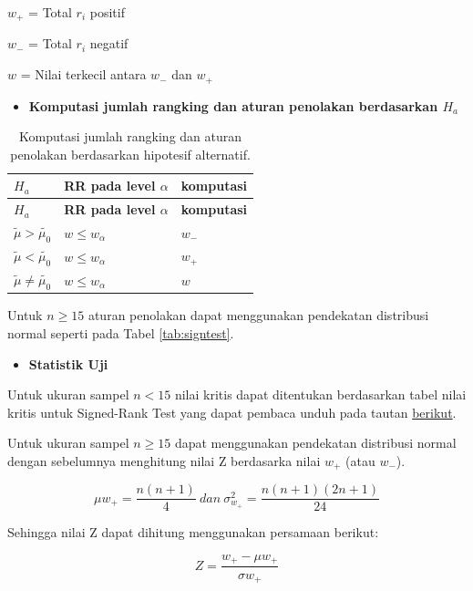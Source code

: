 \documentclass[]{book}
\providecommand{\tightlist}{%
  \setlength{\itemsep}{0pt}\setlength{\parskip}{0pt}}
\begin{document}
\(w_+\) = Total \(r_i\) positif

\(w_-\) = Total \(r_i\) negatif

\(w\) = Nilai terkecil antara \(w_-\) dan \(w_+\)

\begin{itemize}
\tightlist
\item
  \textbf{Komputasi jumlah rangking dan aturan penolakan berdasarkan
  \(H_a\)}
\end{itemize}

\begin{longtable}[]{@{}lll@{}}
\caption{\label{tab:signranktest} Komputasi jumlah rangking dan aturan
penolakan berdasarkan hipotesif alternatif.}\tabularnewline
\toprule
\textbf{\(H_a\)} & \textbf{RR pada level \(\alpha\)} &
\textbf{komputasi}\tabularnewline
\midrule
\endfirsthead
\toprule
\textbf{\(H_a\)} & \textbf{RR pada level \(\alpha\)} &
\textbf{komputasi}\tabularnewline
\midrule
\endhead
\(\tilde{\mu}> \tilde{\mu_0}\) & \(w \le w_\alpha\) &
\(w_-\)\tabularnewline
\(\tilde{\mu}< \tilde{\mu_0}\) & \(w \le w_\alpha\) &
\(w_+\)\tabularnewline
\(\tilde{\mu}\ne\tilde{\mu_0}\) & \(w \le w_\alpha\) &
\(w\)\tabularnewline
\bottomrule
\end{longtable}

Untuk \(n\ge15\) aturan penolakan dapat menggunakan pendekatan
distribusi normal seperti pada Tabel \ref{tab:signtest}.

\begin{itemize}
\tightlist
\item
  \textbf{Statistik Uji}
\end{itemize}

Untuk ukuran sampel \(n<15\) nilai kritis dapat ditentukan berdasarkan
tabel nilai kritis untuk Signed-Rank Test yang dapat pembaca unduh pada
tautan
\href{https://math.ucalgary.ca/files/math/wilcoxon_signed_rank_table.pdf}{berikut}.

Untuk ukuran sampel \(n\ge15\) dapat menggunakan pendekatan distribusi
normal dengan sebelumnya menghitung nilai Z berdasarka nilai \(w_+\)
(atau \(w_-\)).

\begin{equation}
\mu w_+=\frac{n\left(n+1\right)}{4}\ dan\ \sigma_{w_+}^2=\frac{n\left(n+1\right)\left(2n+1\right)}{24}
  \label{eq:signranktesteq}
\end{equation}

Sehingga nilai Z dapat dihitung menggunakan persamaan berikut:

\begin{equation}
Z=\frac{w_+-\mu w_+}{\sigma w_+}
  \label{eq:signranktesteq2}
\end{equation}
\end{document}
